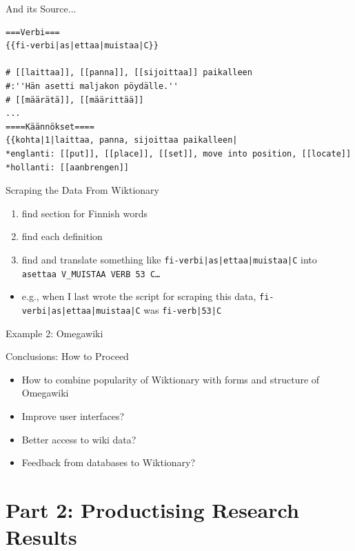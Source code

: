 \documentclass[t,12pt]{beamer}
\begin{document}
\begin{frame}[fragile]{And its Source...}
    \begin{verbatim}
===Verbi===
{{fi-verbi|as|ettaa|muistaa|C}}

# [[laittaa]], [[panna]], [[sijoittaa]] paikalleen
#:''Hän asetti maljakon pöydälle.''
# [[määrätä]], [[määrittää]]
...
====Käännökset====
{{kohta|1|laittaa, panna, sijoittaa paikalleen|
*englanti: [[put]], [[place]], [[set]], move into position, [[locate]]
*hollanti: [[aanbrengen]]
\end{verbatim}
\end{frame}

\begin{frame}{Scraping the Data From Wiktionary}
    \begin{enumerate}
        \item find section for Finnish words
        \item find each definition
        \item find and translate something like
            \texttt{fi-verbi|as|ettaa|muistaa|C}
                into \texttt{asettaa V\_MUISTAA VERB 53 C\ldots}
    \end{enumerate}
    \begin{itemize}
        \item e.g., when I last wrote the script for scraping this data,
            \texttt{fi-verbi|as|ettaa|muistaa|C} was \texttt{fi-verb|53|C}
    \end{itemize}
\end{frame}

\begin{frame}{Example 2: Omegawiki}

\end{frame}

\begin{frame}{Conclusions: How to Proceed}
    \begin{itemize}
        \item How to combine popularity of Wiktionary with forms and structure
            of Omegawiki
        \item Improve user interfaces?
        \item Better access to wiki data?
        \item Feedback from databases to Wiktionary?
    \end{itemize}
\end{frame}

\section{Part 2: Productising Research Results}
\end{document}
